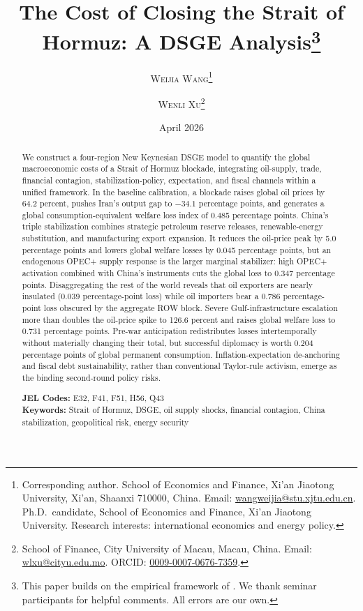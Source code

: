 \documentclass[12pt]{article}
\title{The Cost of Closing the Strait of Hormuz: A DSGE Analysis\thanks{This paper builds on the empirical framework of \citet{federle2026price}. We thank seminar participants for helpful comments. All errors are our own.}}
\author{
  \textsc{Weijia Wang}\thanks{Corresponding author. School of Economics and Finance, Xi'an Jiaotong University, Xi'an, Shaanxi 710000, China. Email: \href{mailto:wangweijia@stu.xjtu.edu.cn}{wangweijia@stu.xjtu.edu.cn}. Ph.D.\ candidate, School of Economics and Finance, Xi'an Jiaotong University. Research interests: international economics and energy policy.}
  \and
  \textsc{Wenli Xu}\thanks{School of Finance, City University of Macau, Macau, China. Email: \href{mailto:wlxu@cityu.edu.mo}{wlxu@cityu.edu.mo}. ORCID: \href{https://orcid.org/0009-0007-0676-7359}{0009-0007-0676-7359}.}
}
\date{April 2026}
\begin{document}
\maketitle

\begin{abstract}
We construct a four-region New Keynesian DSGE model to quantify the global macroeconomic costs of a Strait of Hormuz blockade, integrating oil-supply, trade, financial contagion, stabilization-policy, expectation, and fiscal channels within a unified framework. In the baseline calibration, a blockade raises global oil prices by 64.2 percent, pushes Iran's output gap to $-34.1$ percentage points, and generates a global consumption-equivalent welfare loss index of 0.485 percentage points. China's triple stabilization combines strategic petroleum reserve releases, renewable-energy substitution, and manufacturing export expansion. It reduces the oil-price peak by 5.0 percentage points and lowers global welfare losses by 0.045 percentage points, but an endogenous OPEC+ supply response is the larger marginal stabilizer: high OPEC+ activation combined with China's instruments cuts the global loss to 0.347 percentage points. Disaggregating the rest of the world reveals that oil exporters are nearly insulated (0.039 percentage-point loss) while oil importers bear a 0.786 percentage-point loss obscured by the aggregate ROW block. Severe Gulf-infrastructure escalation more than doubles the oil-price spike to 126.6 percent and raises global welfare loss to 0.731 percentage points. Pre-war anticipation redistributes losses intertemporally without materially changing their total, but successful diplomacy is worth 0.204 percentage points of global permanent consumption. Inflation-expectation de-anchoring and fiscal debt sustainability, rather than conventional Taylor-rule activism, emerge as the binding second-round policy risks.

\bigskip
\noindent \textbf{JEL Codes:} E32, F41, F51, H56, Q43 \\
\noindent \textbf{Keywords:} Strait of Hormuz, DSGE, oil supply shocks, financial contagion, China stabilization, geopolitical risk, energy security
\end{abstract}

\thispagestyle{empty}
\newpage
\setcounter{page}{1}

\end{document}
